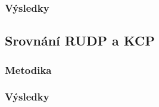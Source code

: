 \documentclass{article}
\begin{document}
\subsubsection{Výsledky}

\subsection{Srovnání RUDP a KCP}

\subsubsection{Metodika}

\subsubsection{Výsledky}

\newpage
\end{document}
